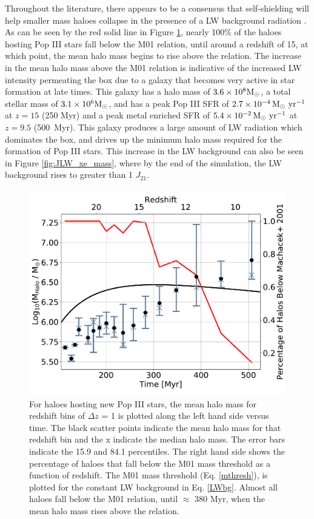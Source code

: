 \documentclass[fleqn,usenatbib]{mnras}
\begin{document}
Throughout the literature, there appears to be a consensus that \hh{} self-shielding will help smaller mass haloes collapse in the presence of a LW background radiation \citep[e.g.][]{Yoshida03, Ricotti01, Glover01, Hartwig15}. As can be seen by the red solid line in Figure \ref{fig:mean_mass}, nearly 100\% of the haloes hosting Pop III stars fall below the M01 relation, until around a redshift of 15, at which point, the mean halo mass begins to rise above the relation. The increase in the mean halo mass above the M01 relation is indicative of the increased LW intensity permeating the box due to a galaxy that becomes very active in star formation at late times. This galaxy has a halo mass of $3.6 \times 10^{8} \rm M_{\odot}$, a total stellar mass of $3.1 \times 10^{6} \rm M_{\odot}$, and has a peak Pop III SFR of $2.7 \times 10^{-4}\, \rm M_{\odot}\ yr^{-1}$ at $z=15$ (250 Myr) and a peak metal enriched SFR of $5.4 \times 10^{-2}\, \rm M_{\odot} \ yr^{-1}$ at $z=9.5$ (500~Myr). This galaxy produces a large amount of LW radiation which dominates the box, and drives up the minimum halo mass required for the formation of Pop III stars. This increase in the LW background can also be seen in Figure \ref{fig:JLW_xe_mass}, where by the end of the simulation, the LW background rises to greater than 1 $J_{21}$.

\begin{figure}
	\includegraphics[width=\columnwidth]{images/mean_mass_errorb_fix.pdf}
    \caption{For haloes hosting new Pop III stars, the mean halo mass for redshift bins of $\Delta z$ = 1 is plotted along the left hand side versus time. The black scatter points indicate the mean halo mass for that redshift bin and the x indicate the median halo mass. The error bars indicate the 15.9 and 84.1 percentiles. The right hand side shows the percentage of haloes that fall below the M01 mass threshold as a function of redshift. The M01 mass threshold (Eq. \ref{mthresh}), is plotted for the constant LW background in Eq. \ref{LWbg}. Almost all haloes fall below the M01 relation, until $\approx$ 380 Myr, when the mean halo mass rises above the relation.}
    \label{fig:mean_mass}
\end{figure}
\end{document}
